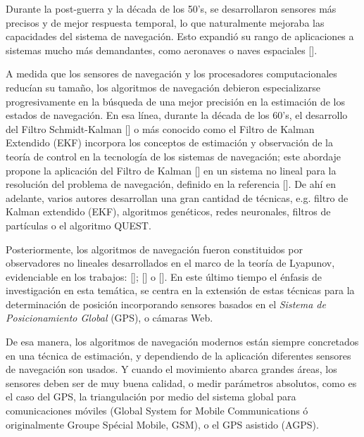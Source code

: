 \documentclass[10pt]{report}
\numberwithin{equation}{chapter}
\numberwithin{algorithm}{chapter}
\begin{document}
Durante la post-guerra y la década de los 50's, se desarrollaron sensores más precisos y de mejor respuesta temporal, lo que naturalmente mejoraba las capacidades del sistema de navegación. Esto expandió su rango de aplicaciones a sistemas mucho más demandantes, como aeronaves o naves espaciales [\cite{Hall1996}].\par
A medida que los sensores de navegación y los procesadores computacionales reducían su tamaño, los algoritmos de navegación debieron especializarse progresivamente en la búsqueda de una mejor precisión en la estimación de los estados de navegación. En esa línea, durante la década de los 60's, el desarrollo del Filtro Schmidt-Kalman [\cite{Schmidt1966}] o más conocido como el Filtro de Kalman Extendido (EKF) incorpora los conceptos de estimación y observación de la teoría de control en la tecnología de los sistemas de navegación; este abordaje propone la aplicación del Filtro de Kalman [\cite{Kalman1960}] en un sistema no lineal para la resolución del problema de navegación, definido en la referencia [\cite{Schmidt1962}]. De ahí en adelante, varios autores desarrollan una gran cantidad de técnicas, e.g. filtro de Kalman extendido (EKF), algoritmos genéticos, redes neuronales, filtros de partículas o el algoritmo QUEST.\par
Posteriormente, los algoritmos de navegación fueron constituidos por observadores no lineales desarrollados en el marco de la teoría de Lyapunov, %
evidenciable en los trabajos: [\cite{Lukyanov1996}]; [\cite{Nicosia1996}] o [\cite{Algrain1997}]. En este último tiempo el énfasis de investigación en esta temática, se centra en la extensión de estas técnicas para la determinación de posición incorporando sensores basados en el \emph{Sistema de Posicionamiento Global} (GPS), o cámaras Web.\par
De esa manera, los algoritmos de navegación modernos están siempre concretados en una técnica de estimación, y dependiendo de la aplicación diferentes sensores de navegación son usados. Y cuando el movimiento abarca grandes áreas, los sensores deben ser de muy buena calidad, o medir parámetros absolutos, como es el caso del GPS, la triangulación por medio del sistema global para comunicaciones móviles (Global System for Mobile Communications ó originalmente Groupe Spécial Mobile, GSM), o el GPS asistido (AGPS).\par
\end{document}
